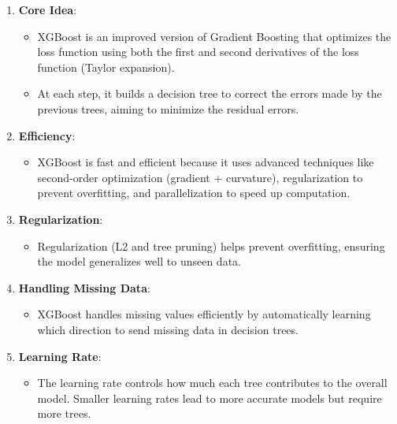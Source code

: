 \documentclass[12pt]{book}
\providecommand{\tightlist}{%
  \setlength{\itemsep}{0pt}\setlength{\parskip}{0pt}}
\begin{document}
\begin{enumerate}
\def\labelenumi{\arabic{enumi}.}
\tightlist
\item
  \textbf{Core Idea}:

  \begin{itemize}
  \tightlist
  \item
    XGBoost is an improved version of Gradient Boosting that optimizes
    the loss function using both the first and second derivatives of the
    loss function (Taylor expansion).
  \item
    At each step, it builds a decision tree to correct the errors made
    by the previous trees, aiming to minimize the residual errors.
  \end{itemize}
\item
  \textbf{Efficiency}:

  \begin{itemize}
  \tightlist
  \item
    XGBoost is fast and efficient because it uses advanced techniques
    like second-order optimization (gradient + curvature),
    regularization to prevent overfitting, and parallelization to speed
    up computation.
  \end{itemize}
\item
  \textbf{Regularization}:

  \begin{itemize}
  \tightlist
  \item
    Regularization (L2 and tree pruning) helps prevent overfitting,
    ensuring the model generalizes well to unseen data.
  \end{itemize}
\item
  \textbf{Handling Missing Data}:

  \begin{itemize}
  \tightlist
  \item
    XGBoost handles missing values efficiently by automatically learning
    which direction to send missing data in decision trees.
  \end{itemize}
\item
  \textbf{Learning Rate}:

  \begin{itemize}
  \tightlist
  \item
    The learning rate controls how much each tree contributes to the
    overall model. Smaller learning rates lead to more accurate models
    but require more trees.
  \end{itemize}
\end{enumerate}
\end{document}
